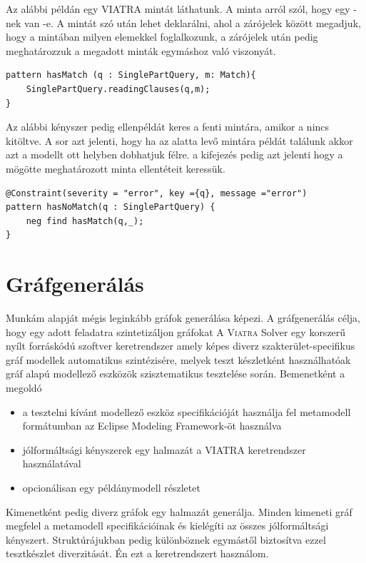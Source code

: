 Az alábbi példán egy  \textsc{VIATRA} mintát láthatunk. A minta arról szól, hogy egy -nek van -e. A mintát  szó után lehet deklarálni, ahol a zárójelek között megadjuk, hogy a mintában milyen elemekkel foglalkozunk, a zárójelek után pedig meghatározzuk a megadott minták egymáshoz való viszonyát.

\begin{lstlisting}[style=viatrasmall]
pattern hasMatch (q : SinglePartQuery, m: Match){
	SinglePartQuery.readingClauses(q,m);
}
\end{lstlisting}  

 Az alábbi kényszer pedig ellenpéldát keres a fenti mintára, amikor a  nincs kitöltve. A  sor azt jelenti, hogy ha az alatta levő mintára példát találunk akkor azt a modellt ott helyben dobhatjuk félre. a  kifejezés pedig azt jelenti hogy a mögötte meghatározott minta ellentéteit keressük.

\begin{lstlisting}[style=viatrasmall]
@Constraint(severity = "error", key ={q}, message ="error")
pattern hasNoMatch(q : SinglePartQuery) {
    neg find hasMatch(q,_);
}
\end{lstlisting}  


 

\section{Gráfgenerálás}
Munkám alapját mégis leginkább gráfok generálása képezi. A gráfgenerálás célja, hogy egy adott feladatra szintetizáljon gráfokat  A \textsc{Viatra} Solver \cite{viatrasolver} egy korszerű nyílt forráskódú szoftver keretrendszer amely képes diverz szakterület-specifikus gráf modellek automatikus szintézisére, melyek teszt készletként használhatóak gráf alapú modellező eszközök szisztematikus tesztelése során. Bemenetként a megoldó 
\begin{itemize}
	\item a tesztelni kívánt modellező eszköz specifikációját használja fel metamodell formátumban az Eclipse Modeling Framework-öt használva
	\item jólformáltsági kényszerek egy halmazát a  \textsc{VIATRA} keretrendszer használatával
	\item opcionálisan egy példánymodell részletet
\end{itemize}

 Kimenetként pedig diverz gráfok egy halmazát generálja. Minden kimeneti gráf megfelel a metamodell specifikációinak és kielégíti az összes jólformáltsági kényszert. Struktúrájukban pedig különböznek egymástől biztosítva ezzel tesztkészlet diverzitását. Én ezt a keretrendszert használom.






